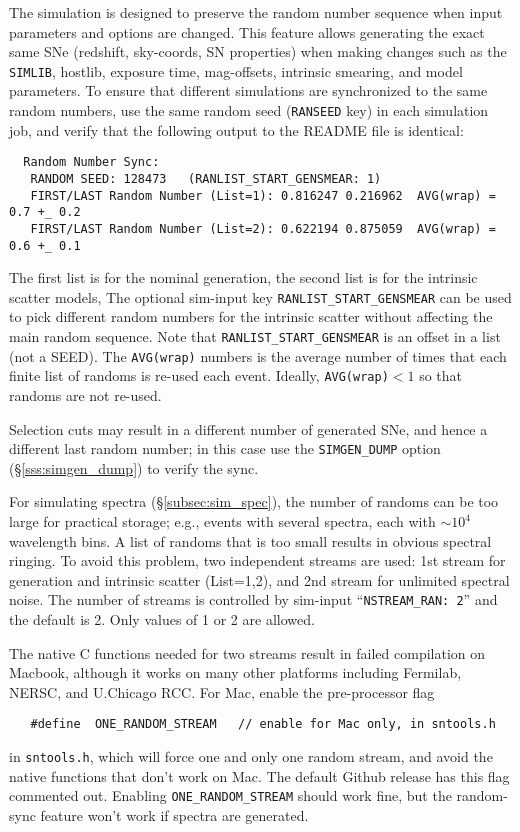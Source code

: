 \documentclass[12pt]{article}
\newcommand{\simlib}{{\tt SIMLIB}}
\newcommand{\hostlib}{{\sc hostlib}}
\begin{document}
{The simulation is designed to preserve the random number sequence
when input parameters and options are changed. This feature allows
generating the exact same SNe (redshift, sky-coords, SN properties)
when making changes such as the 
\simlib, \hostlib, exposure time, mag-offsets, intrinsic smearing, and 
model parameters.
To ensure that different simulations are synchronized to the
same random numbers, use the same random seed ({\tt RANSEED} key)
in each simulation job, 
and verify that the following output to the README file
is identical:
\begin{verbatim}
  Random Number Sync: 
   RANDOM SEED: 128473   (RANLIST_START_GENSMEAR: 1)
   FIRST/LAST Random Number (List=1): 0.816247 0.216962  AVG(wrap) = 0.7 +_ 0.2 
   FIRST/LAST Random Number (List=2): 0.622194 0.875059  AVG(wrap) = 0.6 +_ 0.1 
\end{verbatim}
The first list is for the nominal generation, 
the second list is for the intrinsic scatter models,
The optional sim-input key {\tt RANLIST\_START\_GENSMEAR} 
can be used to pick different random numbers for the intrinsic
scatter without affecting the main random sequence.
Note that {\tt RANLIST\_START\_GENSMEAR} is an offset 
in a list (not a SEED).
The {\tt AVG(wrap)} numbers is the average number of times
that each finite list of randoms is re-used each event.
Ideally, {\tt AVG(wrap)}$<1$ so that randoms are not re-used.

Selection cuts may result in a different number of generated
SNe, and hence a different last random number; in this case
use the {\tt SIMGEN\_DUMP} option (\S\ref{sss:simgen_dump})
to verify the sync.

For simulating spectra (\S\ref{subsec:sim_spec}), the number
of randoms can be too large for practical storage;
e.g., events with several spectra, each with $\sim 10^4$ wavelength bins.
A  list of randoms that is too small results in obvious spectral ringing.
To avoid this problem, two independent streams are used:
1st stream for generation and intrinsic scatter (List=1,2),
and 2nd stream for unlimited spectral noise. The number of
streams is controlled by sim-input ``{\tt NSTREAM\_RAN: 2}''
and the default is 2. Only values of 1 or 2 are allowed.

The native C functions needed for two streams result in 
failed compilation on Macbook, although it works on many
other platforms including Fermilab, NERSC, and U.Chicago RCC.
For Mac, enable the pre-processor flag
\begin{verbatim}
   #define  ONE_RANDOM_STREAM   // enable for Mac only, in sntools.h
\end{verbatim}
in {\tt sntools.h}, which will force one and only one random
stream, and avoid the native functions that don't work on Mac.
The default Github release has this flag commented out. 
Enabling {\tt ONE\_RANDOM\_STREAM} should work fine, 
but the random-sync feature won't work if spectra are generated.

}
\end{document}
